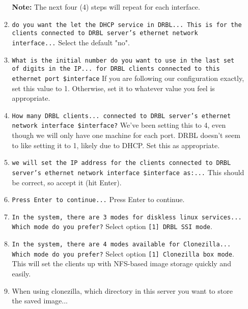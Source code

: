 \documentclass{article}
\def\code#1{\texttt{#1}}
\begin{document}
\begin{flushleft}
\begin{enumerate}
\begin{enumerate}
    \textbf{Note:} The next four (4) steps will repeat for each interface.
    \item \code{do you want the let the DHCP service in DRBL... This is for the clients connected to DRBL server's ethernet network interface...}\linebreak\linebreak
    Select the default "no".
    \item \code{What is the initial number do you want to use in the last set of digits in the IP... for DRBL clients connected to this ethernet port \$interface}\linebreak\linebreak
    If you are following our configuration exactly, set this value to 1.  Otherwise, set it to whatever value you feel is appropriate.
    \item \code{How many DRBL clients... connected to DRBL server's ethernet network interface \$interface?}\linebreak\linebreak
    We've been setting this to 4, even though we will only have one machine for each port.  DRBL doesn't seem to like setting it to 1, likely due to DHCP.  Set this as appropriate.
    \item \code{we will set the IP address for the clients connected to DRBL server's ethernet network interface \$interface as:...}\linebreak\linebreak
    This should be correct, so accept it (hit Enter).
    \item \code{Press Enter to continue...}\linebreak\linebreak
    Press Enter to continue.
    \item \code{In the system, there are 3 modes for diskless linux services... Which mode do you prefer?}\linebreak\linebreak
    Select option \code{[1] DRBL SSI mode}.
    \item \code{In the system, there are 4 modes available for Clonezilla... Which mode do you prefer?}\linebreak\linebreak
    Select option \code{[1] Clonezilla box mode}.  This will set the clients up with NFS-based image storage quickly and easily.
    \item {When using clonezilla, which directory in this server you want to store the saved image...}\linebreak\linebreak

\end{enumerate}
\end{enumerate}
\end{flushleft}
\end{document}
